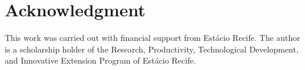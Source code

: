 \documentclass[journal]{IEEEtran}
\begin{document}
\section*{Acknowledgment}
This work was carried out with financial support from Est\'{a}cio Recife. The author is a scholarship holder of the Research, Productivity, Technological Development, and Innovative Extension Program of Est\'{a}cio Recife.


\ifCLASSOPTIONcaptionsoff
  \newpage
\fi




\end{document}
